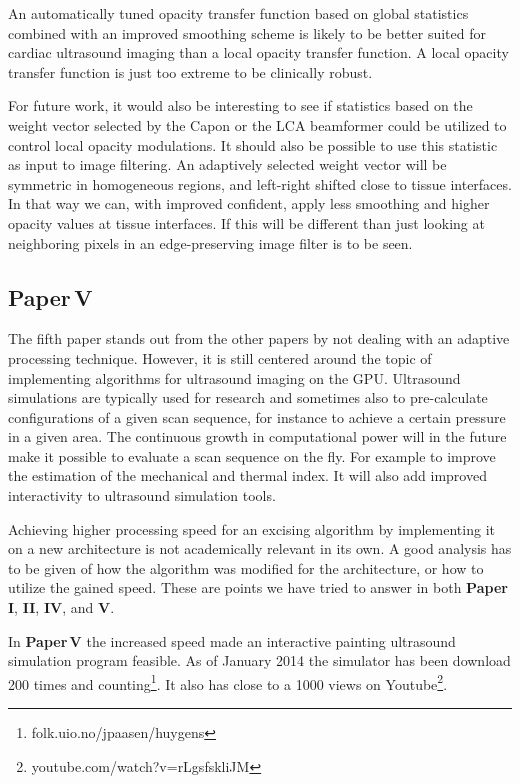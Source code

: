 An automatically tuned opacity transfer function based on global statistics combined with an improved smoothing scheme is likely to be better suited for cardiac ultrasound imaging than a local opacity transfer function. A local opacity transfer function is just too extreme to be clinically robust. 

For future work, it would also be interesting to see if statistics based on the weight vector selected by the Capon or the LCA beamformer could be utilized to control local opacity modulations. It should also be possible to use this statistic as input to image filtering. An adaptively selected weight vector will be symmetric in homogeneous regions, and left-right shifted close to tissue interfaces. In that way we can, with improved confident, apply less smoothing and higher opacity values at tissue interfaces. If this will be different than just looking at neighboring pixels in an edge-preserving image filter is to be seen.

\subsection{Paper\,V}
The fifth paper stands out from the other papers by not dealing with an adaptive processing technique. However, it is still centered around the topic of implementing algorithms for ultrasound imaging on the GPU. Ultrasound simulations are typically used for research and sometimes also to pre-calculate configurations of a given scan sequence, for instance to achieve a certain pressure in a given area. The continuous growth in computational power will in the future make it possible to evaluate a scan sequence on the fly. For example to improve the estimation of the mechanical and thermal index. It will also add improved interactivity to ultrasound simulation tools. 

Achieving higher processing speed for an excising algorithm by implementing it on a new architecture is not academically relevant in its own. A good analysis has to be given of how the algorithm was modified for the architecture, or how to utilize the gained speed. These are points we have tried to answer in both \textbf{Paper\,I}, \textbf{II},  \textbf{IV}, and \textbf{V}.  

In \textbf{Paper\,V} the increased speed made an interactive painting ultrasound simulation program feasible. As of January 2014 the simulator has been download 200 times and counting\footnote{folk.uio.no/jpaasen/huygens}. It also has close to a 1000 views on Youtube\footnote{youtube.com/watch?v=rLgsfskliJM}.

